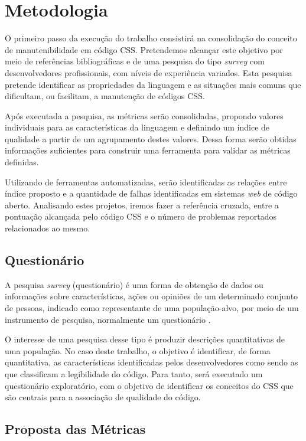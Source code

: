 %
%

\chapter{Metodologia}

O primeiro passo da execução do trabalho consistirá na consolidação do conceito de manutenibilidade em código CSS. Pretendemos alcançar este objetivo por meio de referências bibliográficas e de uma pesquisa do tipo \textit{survey} com desenvolvedores profissionais, com níveis de experiência variados. Esta pesquisa pretende identificar as propriedades da linguagem e as situações mais comuns que dificultam, ou facilitam, a manutenção de códigos CSS.

Após executada a pesquisa, as métricas serão consolidadas, propondo valores individuais para as características da linguagem e definindo um índice de qualidade a partir de um agrupamento destes valores. Dessa forma serão obtidas informações suficientes para construir uma ferramenta para validar as métricas definidas.

Utilizando de ferramentas automatizadas, serão identificadas as relações entre índice proposto e a quantidade de falhas identificadas em sistemas \textit{web} de código aberto. Analisando estes projetos, iremos fazer a referência cruzada, entre a pontuação alcançada pelo código CSS e o número de problemas reportados relacionados ao mesmo.

\section{Questionário}

A pesquisa \textit{survey} (questionário) é uma forma de obtenção de dados ou informações sobre características, ações ou opiniões de um determinado conjunto de pessoas, indicado como representante de uma população-alvo, por meio de um instrumento de pesquisa, normalmente um questionário \cite{Freitas2000}. 

O interesse de uma pesquisa desse tipo é produzir descrições quantitativas de uma população. No caso deste trabalho, o objetivo é identificar, de forma quantitativa, as características identificadas pelos desenvolvedores como sendo as que classificam a legibilidade do código. Para tanto, será executado um questionário exploratório, com o objetivo de identificar os conceitos do CSS que são centrais para a associação de qualidade do código.

\section{Proposta das Métricas}

